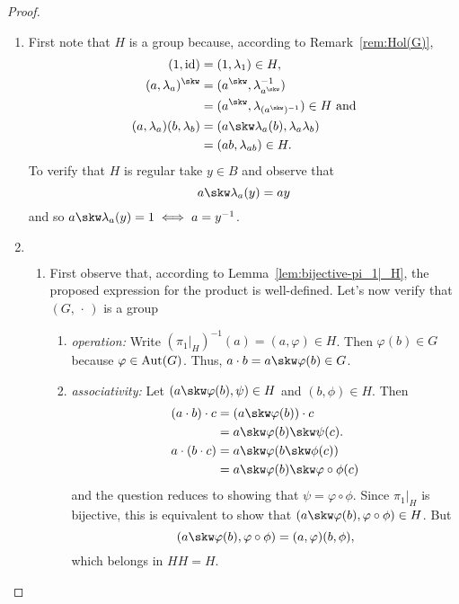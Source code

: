 \begin{proof}${}$
    \begin{enumerate}[\rm a)]
        \item First note that $H$ is a group because, according to Remark~\ref{rem:Hol(G)},
        \begin{align*}
            (1,\id) &= (1,\lambda_1)\in H,\\
            (a,\lambda_a)^\skw &= (a^\skw,\lambda^{-1}_{a^\skw})\\
                &= (a^\skw,\lambda_{(a^\skw)^{-1}})\in H
                \text{ and}\\
            (a,\lambda_a)(b,\lambda_b)
                &= (a\skw \lambda_a(b),\lambda_a\lambda_b)\\
                &= (ab,\lambda_{ab})\in H.
        \end{align*}
        To verify that $H$ is regular take $y\in B$ and observe that
        $$
            a\skw\lambda_a(y)=ay
        $$
        and so $a\skw\lambda_a(y)=1\iff a=y^{-1}$.

        \item ${}$
        \begin{enumerate}[\rm i)]
            \item First observe that, according to Lemma~\ref{lem:bijective-pi_1|_H}, the proposed expression for the product is well-defined. Let's now verify that $(G,\,\cdot\,)$ is a group
            \begin{enumerate}[-]
                \item \textit{operation:} Write $(\pi_1|_H)^{-1}(a)=(a,\varphi)\in H$. Then $\varphi(b)\in G$ because $\varphi\in{\rm Aut}(G)$. Thus, $a\cdot b = a\skw\varphi(b)\in G$.
                \item \textit{associativity:} Let $(a\skw\varphi(b),\psi)\in H$ and $(b,\phi)\in H$. Then
                \begin{align*}
                    (a\cdot b)\cdot c
                        &= (a\skw\varphi(b))\cdot c\\
                        &= a\skw\varphi(b)\skw\psi(c).\\
                    a\cdot(b\cdot c)
                        &= a\skw\varphi(b\skw\phi(c))\\
                        &= a\skw\varphi(b)\skw\varphi\circ\phi(c)
                \end{align*}
                and the question reduces to showing that $\psi=\varphi\circ\phi$. Since $\pi_1|_H$ is bijective, this is equivalent to show that $(a\skw\varphi(b),\varphi\circ\phi)\in H$. But
                $$
                    (a\skw\varphi(b),\varphi\circ\phi) = (a,\varphi)(b,\phi),
                $$
                which belongs in $HH=H$.


\end{enumerate}
\end{enumerate}
\end{enumerate}
\end{proof}
